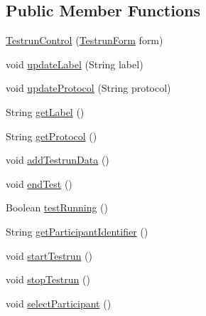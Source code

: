 \subsection*{Public Member Functions}
\begin{DoxyCompactItemize}
\item 
\hyperlink{class_web_analyzer_1_1_u_i_1_1_interaction_objects_1_1_testrun_control_a4c7cc1fb505c57b84d0247abb85eb424}{Testrun\+Control} (\hyperlink{class_web_analyzer_1_1_u_i_1_1_testrun_form}{Testrun\+Form} form)
\item 
void \hyperlink{class_web_analyzer_1_1_u_i_1_1_interaction_objects_1_1_testrun_control_afe75adb92ec988b41703ce1f4756f0cb}{update\+Label} (String label)
\item 
void \hyperlink{class_web_analyzer_1_1_u_i_1_1_interaction_objects_1_1_testrun_control_a4d48e389fa01651d00601014fd26abc2}{update\+Protocol} (String protocol)
\item 
String \hyperlink{class_web_analyzer_1_1_u_i_1_1_interaction_objects_1_1_testrun_control_ab200223a2ab56282c3312d2d4019b689}{get\+Label} ()
\item 
String \hyperlink{class_web_analyzer_1_1_u_i_1_1_interaction_objects_1_1_testrun_control_a8a702b4953fe5cb8d9de125a1004f003}{get\+Protocol} ()
\item 
void \hyperlink{class_web_analyzer_1_1_u_i_1_1_interaction_objects_1_1_testrun_control_a2ca0a1cab51ceaef19727b11a22c2394}{add\+Testrun\+Data} ()
\item 
void \hyperlink{class_web_analyzer_1_1_u_i_1_1_interaction_objects_1_1_testrun_control_afa240c157d4dca3e5399625cf59afd8c}{end\+Test} ()
\item 
Boolean \hyperlink{class_web_analyzer_1_1_u_i_1_1_interaction_objects_1_1_testrun_control_ae1dacc2d3e11d88116b3dbf9c45ea403}{test\+Running} ()
\item 
String \hyperlink{class_web_analyzer_1_1_u_i_1_1_interaction_objects_1_1_testrun_control_a91ae8944392f8e0aef79106e157091a6}{get\+Participant\+Identifier} ()
\item 
void \hyperlink{class_web_analyzer_1_1_u_i_1_1_interaction_objects_1_1_testrun_control_af27f7dfe9f65ab63b139bc58873eb689}{start\+Testrun} ()
\item 
void \hyperlink{class_web_analyzer_1_1_u_i_1_1_interaction_objects_1_1_testrun_control_a5f0c295b6abbeade6416f7a8fec63d70}{stop\+Testrun} ()
\item 
void \hyperlink{class_web_analyzer_1_1_u_i_1_1_interaction_objects_1_1_testrun_control_ad6ef95e986f389417a22a36b6e95ef36}{select\+Participant} ()

\end{DoxyCompactItemize}
